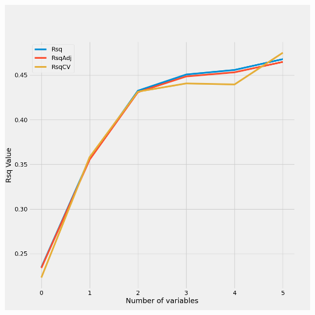 \documentclass{article}
\begin{document}
	\includegraphics[scale = 0.2]{../plots/python/ConcreteStepwise3L.png}
	
\end{document}
